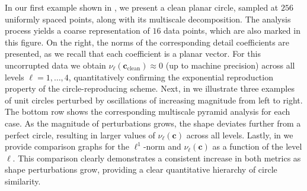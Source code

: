 \documentclass[11pt,a4paper]{article}
\theoremstyle{definition}
\begin{document}
In our first example shown in , we present a clean planar circle, sampled at $256$ uniformly spaced points, along with its multiscale decomposition. The analysis process yields a coarse representation of $16$ data points, which are also marked in this figure. On the right, the norms of the corresponding detail coefficients are presented, as we recall that each coefficient is a planar vector.
For this uncorrupted data we obtain $\nu_\ell(\boldsymbol{c}_{\text{clean}}) \approx 0$ (up to machine precision) across all levels $\ell=1,\dots,4$, quantitatively confirming the exponential reproduction property of the circle-reproducing scheme. 
Next, in  we illustrate three examples of unit circles perturbed by oscillations of increasing magnitude from left to right. The bottom row shows the corresponding multiscale pyramid analysis for each case. As the magnitude of perturbations grows, the shape deviates further from a perfect circle, resulting in larger values of $\nu_\ell(\boldsymbol{c})$ across all levels. Lastly, in  we provide comparison graphs for the $\ell^1$-norm and $\nu_\ell(\boldsymbol{c})$ as a function of the level $\ell$. This comparison clearly demonstrates a consistent increase in both metrics as shape perturbations grow, providing a clear quantitative hierarchy of circle similarity.
\end{document}
